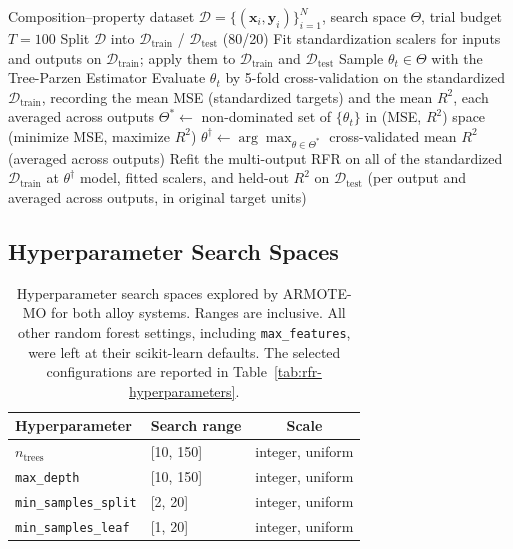 \begin{algorithm}[H]
\caption{ARMOTE-MO: automated multi-output regression with multi-objective
         hyperparameter optimization}
\label{alg:armote}
\begin{algorithmic}[1]
\Require Composition--property dataset $\mathcal{D} = \{(\mathbf{x}_i, \mathbf{y}_i)\}_{i=1}^{N}$,
         search space $\Theta$, trial budget $T = 100$
\State Split $\mathcal{D}$ into $\mathcal{D}_\mathrm{train}$ / $\mathcal{D}_\mathrm{test}$ (80/20)
\State Fit standardization scalers for inputs and outputs on $\mathcal{D}_\mathrm{train}$;
       apply them to $\mathcal{D}_\mathrm{train}$ and $\mathcal{D}_\mathrm{test}$
    \State Sample $\theta_t \in \Theta$ with the Tree-Parzen Estimator
    \State Evaluate $\theta_t$ by 5-fold cross-validation on the standardized
           $\mathcal{D}_\mathrm{train}$, recording the mean MSE (standardized targets)
           and the mean $R^2$, each averaged across outputs
\EndFor
\State $\Theta^{*} \gets$ non-dominated set of $\{\theta_t\}$ in (MSE, $R^2$) space
       (minimize MSE, maximize $R^2$)
\State $\theta^{\dagger} \gets \arg\max_{\theta \in \Theta^{*}}$ cross-validated mean $R^2$
       (averaged across outputs)
\State Refit the multi-output RFR on all of the standardized $\mathcal{D}_\mathrm{train}$ at $\theta^{\dagger}$
\State \Return model, fitted scalers, and held-out $R^2$ on $\mathcal{D}_\mathrm{test}$
       (per output and averaged across outputs, in original target units)
\end{algorithmic}
\end{algorithm}

\subsection{Hyperparameter Search Spaces}
\label{app:armote_spaces}

\begin{table}[H]
\centering
\begin{tabular}{llc}
\toprule
Hyperparameter & Search range & Scale \\
\midrule
$n_\mathrm{trees}$           & [10, 150] & integer, uniform \\
\texttt{max\_depth}          & [10, 150] & integer, uniform \\
\texttt{min\_samples\_split} & [2, 20]   & integer, uniform \\
\texttt{min\_samples\_leaf}  & [1, 20]   & integer, uniform \\
\bottomrule
\end{tabular}
\caption{Hyperparameter search spaces explored by ARMOTE-MO for both alloy
         systems. Ranges are inclusive. All other random forest settings,
         including \texttt{max\_features}, were left at their scikit-learn
         defaults. The selected configurations are reported in
         Table~\ref{tab:rfr-hyperparameters}.}
\label{tab:armote-search-space}
\end{table}

